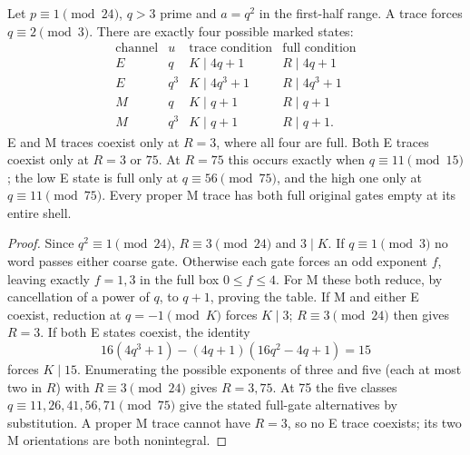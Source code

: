 \begin{theorem}\label{thm:square}
Let $p\equiv1\pmod{24}$, $q>3$ prime and $a=q^2$ in the first-half range.
A trace forces $q\equiv2\pmod3$. There are exactly four possible marked states:
\[
\begin{array}{c|c|c|c}
\text{channel}&u&\text{trace condition}&\text{full condition}\\\hline
E&q&K\mid4q+1&R\mid4q+1\\
E&q^3&K\mid4q^3+1&R\mid4q^3+1\\
M&q&K\mid q+1&R\mid q+1\\
M&q^3&K\mid q+1&R\mid q+1.
\end{array}
\]
E and M traces coexist only at $R=3$, where all four are full. Both E traces
coexist only at $R=3$ or $75$. At $R=75$ this occurs exactly when
$q\equiv11\pmod{15}$; the low E state is full only at $q\equiv56\pmod{75}$,
and the high one only at $q\equiv11\pmod{75}$.
Every proper M trace has both full original gates empty at its entire shell.
\end{theorem}
\begin{proof}
Since $q^2\equiv1\pmod{24}$, $R\equiv3\pmod{24}$ and $3\mid K$.
If $q\equiv1\pmod3$ no word passes either coarse gate. Otherwise each gate
forces an odd exponent $f$, leaving exactly $f=1,3$ in the full box
$0\le f\le4$. For M these both reduce, by cancellation of a power of $q$,
to $q+1$, proving the table.
If M and either E coexist, reduction at $q=-1\pmod K$ forces $K\mid3$;
$R\equiv3\pmod{24}$ then gives $R=3$. If both E states coexist, the identity
\[
 16(4q^3+1)-(4q+1)(16q^2-4q+1)=15
\]
forces $K\mid15$. Enumerating the possible exponents of three and five
(each at most two in $R$) with $R\equiv3\pmod{24}$ gives $R=3,75$.
At 75 the five classes $q\equiv11,26,41,56,71\pmod{75}$ give the stated
full-gate alternatives by substitution. A proper M trace cannot have $R=3$,
so no E trace coexists; its two M orientations are both nonintegral.
\end{proof}

